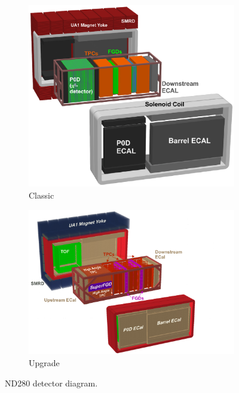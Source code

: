 \begin{figure}
    \centering
    \begin{subfigure}[b]{\dbfigwid\textwidth}
        \centering
        \includegraphics[width=\textwidth]{figures/t2k/ND280-classic.eps}
        \caption{Classic}
        \label{subfig:nd280-classic}
    \end{subfigure}
    \begin{subfigure}[b]{\dbfigwid\textwidth}
        \centering
        \includegraphics[width=\textwidth]{figures/t2k/ND280-up.png}
        \caption{Upgrade}
        \label{subfig:nd280-up}
    \end{subfigure}
    \caption{ND280 detector diagram.}
    \label{fig:nd280-diagram}
\end{figure}

